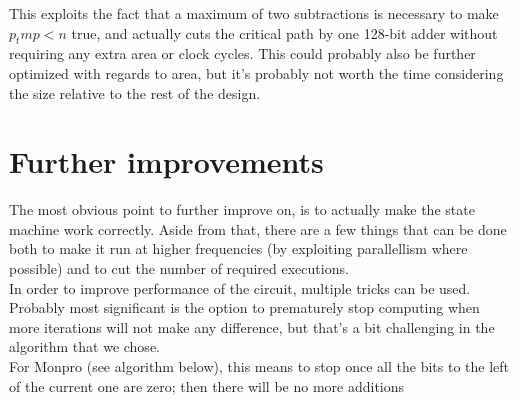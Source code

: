 This exploits the fact that a maximum of two subtractions is necessary to make $p_tmp < n$ true, and actually cuts the critical path by one 128-bit adder without requiring any extra area or clock cycles. This could probably also be further optimized with regards to area, but it's probably not worth the time considering the size relative to the rest of the design.\\


\section{Further improvements}
The most obvious point to further improve on, is to actually make the state machine work correctly. Aside from that, there are a few things that can be done both to make it run at higher frequencies (by exploiting parallellism where possible) and to cut the number of required executions.\\ %
In order to improve performance of the circuit, multiple tricks can be used. Probably most significant is the option to prematurely stop computing when more iterations will not make any difference, but that's a bit challenging in the algorithm that we chose.\\
For Monpro (see algorithm below), this means to stop once all the bits to the left of the current one are zero; then there will be no more additions

\inputminted[firstline=13,lastline=26]{python}{../Project/monexp.py}
